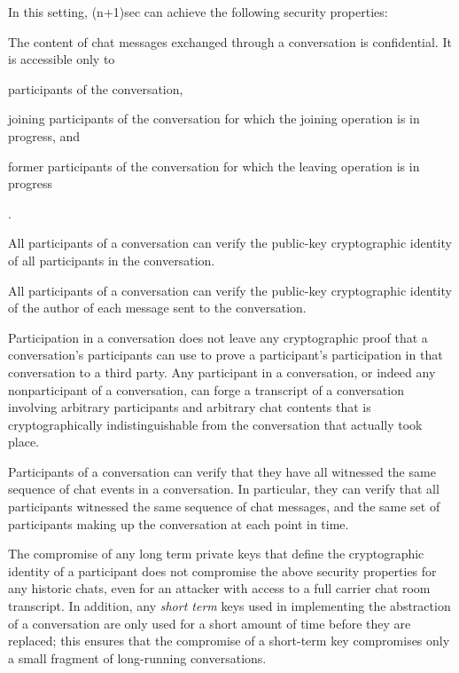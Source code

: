 \documentclass{article}
\begin{document}
In this setting, (n+1)sec can achieve the following security properties:
\begin{description}[noitemsep]
\item[Confidentiality.] The content of chat messages exchanged through a conversation is confidential. It is accessible only to \begin{enumerate*}[label=(\roman*)] \item participants of the conversation, \item joining participants of the conversation for which the joining operation is in progress, and \item former participants of the conversation for which the leaving operation is in progress\end{enumerate*}.
\item[Participant authenticity.] All participants of a conversation can verify the public-key cryptographic identity of all participants in the conversation.
\item[Message origin authenticity.] All participants of a conversation can verify the public-key cryptographic identity of the author of each message sent to the conversation.
\item[Deniability.] Participation in a conversation does not leave any cryptographic proof that a conversation's participants can use to prove a participant's participation in that conversation to a third party. Any participant in a conversation, or indeed any nonparticipant of a conversation, can forge a transcript of a conversation involving arbitrary participants and arbitrary chat contents that is cryptographically indistinguishable from the conversation that actually took place.
\item[Transcript consistency.] Participants of a conversation can verify that they have all witnessed the same sequence of chat events in a conversation. In particular, they can verify that all participants witnessed the same sequence of chat messages, and the same set of participants making up the conversation at each point in time.
\item[Forward secrecy.] The compromise of any long term private keys that define the cryptographic identity of a participant does not compromise the above security properties for any historic chats, even for an attacker with access to a full carrier chat room transcript. In addition, any \emph{short term} keys used in implementing the abstraction of a conversation are only used for a short amount of time before they are replaced; this ensures that the compromise of a short-term key compromises only a small fragment of long-running conversations.
\end{description}
\end{document}
